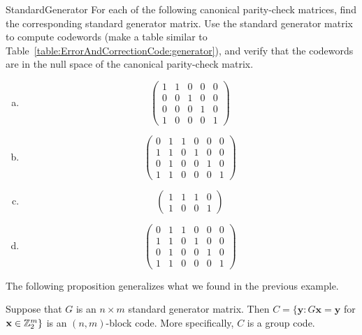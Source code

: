 \begin{exercise}{StandardGenerator}
For each of the following canonical parity-check matrices, find the corresponding standard generator matrix. Use the standard generator matrix to compute codewords (make a table similar to Table~\ref{table:ErrorAndCorrectionCode:generator}), and verify that the codewords are in the null space of the canonical parity-check matrix.
 
\begin{enumerate}[(a)]
 \item
\[
\left(
\begin{array}{ccccc}
1 & 1 & 0 & 0 & 0 \\
0 & 0 & 1 & 0 & 0 \\
0 & 0 & 0 & 1 & 0 \\
1 & 0 & 0 & 0 & 1
\end{array}
\right)
\]

\item
\[
\left(
\begin{array}{cccccc}
0 & 1 & 1 & 0 & 0 & 0 \\
1 & 1 & 0 & 1 & 0 & 0 \\
0 & 1 & 0 & 0 & 1 & 0 \\
1 & 1 & 0 & 0 & 0 & 1
\end{array}
\right)
\]

 \item
\[
\left(
\begin{array}{cccc}
1 & 1 & 1 & 0 \\
1 & 0 & 0 & 1
\end{array}
\right)
\]

 \item
\[
\left(
\begin{array}{cccccc}
0 & 1 & 1 & 0 & 0 & 0 \\
1 & 1 & 0 & 1 & 0 & 0 \\
0 & 1 & 0 & 0 & 1 & 0 \\
1 & 1 & 0 & 0 & 0 & 1
\end{array}
\right)
\]
\end{enumerate}
\end{exercise}

 The following proposition  generalizes what we found in the previous example.
 
 \begin{prop}{}
Suppose that $G$ is an $n \times m$  standard generator matrix.  Then
$C = \{ \textbf{y} : G \textbf{x} =\textbf{y}$  for $\textbf{x} \in
{\Bbb  Z}_2^m \}$ is an  $(n,m)$-block code. More specifically, $C$
is a group code.  
\end{prop}
 

